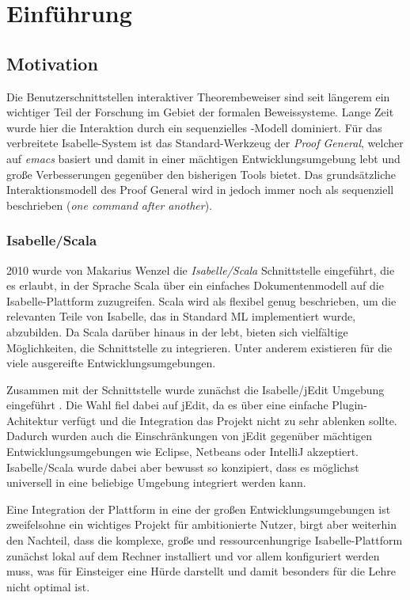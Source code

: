 \chapter{Einführung}

\section{Motivation}

Die Benutzerschnittstellen interaktiver Theorembeweiser sind seit längerem ein wichtiger Teil der
Forschung im Gebiet der formalen Beweissysteme. Lange Zeit wurde hier die Interaktion durch ein
sequenzielles \textit{}-Modell dominiert. Für das verbreitete Isabelle-System ist das
Standard-Werkzeug der \textit{Proof General}, welcher auf \textit{emacs} basiert und damit in einer
mächtigen Entwicklungsumgebung lebt und große Verbesserungen gegenüber den bisherigen Tools bietet.
Das grundsätzliche Interaktionsmodell des Proof General wird in \cite[S. 2]{iscala} jedoch immer
noch als sequenziell beschrieben (\textit{\glqq one command after another\grqq}).

\subsection{Isabelle/Scala}

2010 wurde von Makarius Wenzel die \textit{Isabelle/Scala} \cite{iscala2} Schnittstelle
eingeführt, die es erlaubt, in der Sprache Scala über ein einfaches Dokumentenmodell auf die
Isabelle-Plattform zuzugreifen. Scala wird als flexibel genug beschrieben, um die relevanten Teile
von Isabelle, das in Standard ML implementiert wurde, abzubilden. Da Scala darüber hinaus in der
 lebt, bieten sich vielfältige Möglichkeiten, die Schnittstelle zu integrieren. Unter
anderem existieren für die  viele ausgereifte Entwicklungsumgebungen.

Zusammen mit der Schnittstelle wurde zunächst die Isabelle/jEdit Umgebung eingeführt \cite{iscala}.
Die Wahl fiel dabei auf jEdit, da es über eine einfache Plugin-Achitektur verfügt und die
Integration das Projekt nicht zu sehr ablenken sollte. Dadurch wurden auch die Einschränkungen von
jEdit gegenüber mächtigen Entwicklungsumgebungen wie Eclipse, Netbeans oder IntelliJ akzeptiert.
Isabelle/Scala wurde dabei aber bewusst so konzipiert, dass es möglichst universell in eine
beliebige Umgebung integriert werden kann.

Eine Integration der Plattform in eine der großen Entwicklungsumgebungen ist zweifelsohne ein
wichtiges Projekt für ambitionierte Nutzer, birgt aber weiterhin den Nachteil, dass die komplexe,
große und ressourcenhungrige Isabelle-Plattform zunächst lokal auf dem Rechner installiert und vor
allem konfiguriert werden muss, was für Einsteiger eine Hürde darstellt und damit besonders für die
Lehre nicht optimal ist.

